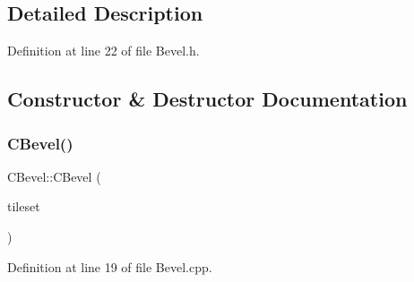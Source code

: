 \subsection{Detailed Description}


Definition at line 22 of file Bevel.\+h.



\subsection{Constructor \& Destructor Documentation}
\hypertarget{classCBevel_ad274c6ae606a5d61b6240ee0c68081f7}{}\label{classCBevel_ad274c6ae606a5d61b6240ee0c68081f7} 
\subsubsection{\texorpdfstring{C\+Bevel()}{CBevel()}}
{\footnotesize\ttfamily C\+Bevel\+::\+C\+Bevel (\begin{DoxyParamCaption}\item[{std\+::shared\+\_\+ptr$<$ \hyperlink{classCGraphicTileset}{C\+Graphic\+Tileset} $>$}]{tileset }\end{DoxyParamCaption})}



Definition at line 19 of file Bevel.\+cpp.


